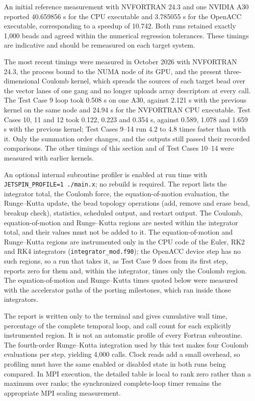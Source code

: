 An initial reference measurement with NVFORTRAN 24.3 and one NVIDIA A30
reported 40.659856 s for the CPU executable and 3.785055 s for the OpenACC
executable, corresponding to a speedup of 10.742. Both runs retained exactly
1,000 beads and agreed within the numerical regression tolerances. These
timings are indicative and should be remeasured on each target system.

The most recent timings were measured in October 2026 with NVFORTRAN 24.3,
the process bound to the NUMA node of its GPU, and the present
three-dimensional Coulomb kernel, which spreads the sources of each target
bead over the vector lanes of one gang and no longer uploads array
descriptors at every call. The Test Case 9 loop took 0.508 s on one A30,
against 2.121 s with the previous kernel on the same node and 24.94 s for
the NVFORTRAN CPU executable. Test Cases 10, 11 and 12 took 0.122, 0.223 and
0.354 s, against 0.589, 1.078 and 1.659 s with the previous kernel; Test
Cases 9--14 run 4.2 to 4.8 times faster than with it. Only the summation
order changes, and the outputs still passed their recorded comparisons. The
other timings of this section and of Test Cases 10--14 were measured with
earlier kernels.

An optional internal subroutine profiler is enabled at run time with
\texttt{JETSPIN\_PROFILE=1 ./main.x}; no rebuild is required. The report
lists the integrator total, the Coulomb force, the equation-of-motion
evaluation, the Runge--Kutta update, the bead topology operations (add,
remove and erase bead, breakup check), statistics, scheduled output, and
restart output. The Coulomb, equation-of-motion and Runge--Kutta regions are
nested within the integrator total, and their values must not be added to
it. The equation-of-motion and Runge--Kutta regions are instrumented only in
the CPU code of the Euler, RK2 and RK4 integrators
(\texttt{integrator\_mod.f90}); the OpenACC device step has no such regions,
so a run that takes it, as Test Case 9 does from its first step, reports
zero for them and, within the integrator, times only the Coulomb region. The
equation-of-motion and Runge--Kutta times quoted below were measured with
the accelerator paths of the porting milestones, which ran inside those
integrators.

The report is written only to the terminal and gives cumulative wall time,
percentage of the complete temporal loop, and call count for each explicitly
instrumented region. It is not an automatic profile of every Fortran
subroutine. The fourth-order Runge--Kutta integration used by this test makes
four Coulomb evaluations per step, yielding 4,000 calls. Clock reads add a
small overhead, so profiling must have the same enabled or disabled state in
both runs being compared. In MPI execution, the detailed table is local to
rank zero rather than a maximum over ranks; the synchronized complete-loop
timer remains the appropriate MPI scaling measurement.

